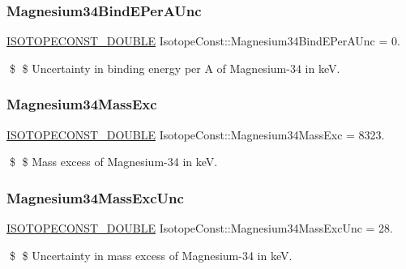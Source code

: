 \subsubsection{\texorpdfstring{Magnesium34\+Bind\+E\+Per\+A\+Unc}{Magnesium34BindEPerAUnc}}
{\footnotesize\ttfamily \mbox{\hyperlink{group___isotope_const-_macros_ga8f45a7272ce02c0b4c65c44636ed719a}{I\+S\+O\+T\+O\+P\+E\+C\+O\+N\+S\+T\+\_\+\+D\+O\+U\+B\+LE}} Isotope\+Const\+::\+Magnesium34\+Bind\+E\+Per\+A\+Unc = 0.}

\$ \$ Uncertainty in binding energy per A of Magnesium-\/34 in keV. \mbox{\label{group___isotope_const-_magnesium-_mg34_gaebb025152e856681332e34f462e0a80f}} 
\subsubsection{\texorpdfstring{Magnesium34\+Mass\+Exc}{Magnesium34MassExc}}
{\footnotesize\ttfamily \mbox{\hyperlink{group___isotope_const-_macros_ga8f45a7272ce02c0b4c65c44636ed719a}{I\+S\+O\+T\+O\+P\+E\+C\+O\+N\+S\+T\+\_\+\+D\+O\+U\+B\+LE}} Isotope\+Const\+::\+Magnesium34\+Mass\+Exc = 8323.}

\$ \$ Mass excess of Magnesium-\/34 in keV. \mbox{\label{group___isotope_const-_magnesium-_mg34_gab2722af4b8e668dc9ddd3e8b3f28719e}} 
\subsubsection{\texorpdfstring{Magnesium34\+Mass\+Exc\+Unc}{Magnesium34MassExcUnc}}
{\footnotesize\ttfamily \mbox{\hyperlink{group___isotope_const-_macros_ga8f45a7272ce02c0b4c65c44636ed719a}{I\+S\+O\+T\+O\+P\+E\+C\+O\+N\+S\+T\+\_\+\+D\+O\+U\+B\+LE}} Isotope\+Const\+::\+Magnesium34\+Mass\+Exc\+Unc = 28.}

\$ \$ Uncertainty in mass excess of Magnesium-\/34 in keV. \mbox{\label{group___isotope_const-_magnesium-_mg34_gaec63d462014fccb075c52c7354bcc214}} 
